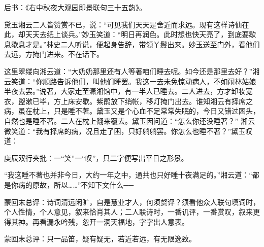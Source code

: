 \begin{parag}
    后书：《右中秋夜大观园即景联句三十五韵》。
\end{parag}


\begin{parag}
    黛玉湘云二人皆赞赏不已，说：“可见我们天天是舍近而求远。现有这样诗仙在此，却天天去纸上谈兵。”妙玉笑道：“明日再润色。此时想也快天亮了，到底要歇息歇息才是。”林史二人听说，便起身告辞，带领丫鬟出来。妙玉送至门外，看他们去远，方掩门进来。不在话下。
\end{parag}


\begin{parag}
    这里翠缕向湘云道：“大奶奶那里还有人等著咱们睡去呢。如今还是那里去好？”湘云笑道：“你顺路告诉他们，叫他们睡罢。我这一去未免惊动病人，不如闹林姑娘半夜去罢。”说著，大家走至潇湘馆中，有一半人已睡去。二人进去，方才卸妆宽衣，盥漱已毕，方上床安歇。紫鹃放下绡帐，移灯掩门出去。谁知湘云有择席之病，虽在枕上，只是睡不著。黛玉又是个心血不足常常失眠的，今日又错过困头，自然也是睡不著。二人在枕上翻来覆去。黛玉因问道：“怎么你还没睡著？” 湘云微笑道：“我有择席的病，况且走了困，只好躺躺罢。你怎么也睡不著？”黛玉叹道：\begin{note}庚辰双行夹批：一“笑”一“叹”，只二字便写出平日之形景。\end{note}“我这睡不著也并非今日，大约一年之中，通共也只好睡十夜满足的。”湘云道：“都是你病的原故，所以……”不知下文什么──
\end{parag}


\begin{parag}
    \begin{note}蒙回末总评：诗词清远闲旷，自是慧业才人，何须赘评？须看他众人联句填词时，个人性情，个人意见，叙来恰肖其人；二人联诗时，一番讥评，一番赏叹，叙来更得其神。再看漏永吟残，忽开一洞天福地，字字出人意表。\end{note}
\end{parag}


\begin{parag}
    \begin{note}蒙回末总评：只一品笛，疑有疑无，若近若远，有无限逸致。\end{note}
\end{parag}